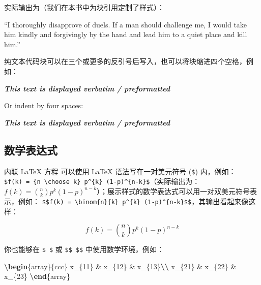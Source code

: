 \documentclass[
  12pt,
]{krantz}
\newenvironment{Shaded}{\begin{snugshade}}{\end{snugshade}}
\newcommand{\ExtensionTok}[1]{#1}
\newcommand{\InformationTok}[1]{\textcolor[rgb]{0.56,0.35,0.01}{\textbf{\textit{#1}}}}
\newcommand{\KeywordTok}[1]{\textcolor[rgb]{0.13,0.29,0.53}{\textbf{#1}}}
\newcommand{\NormalTok}[1]{#1}
\newcommand{\SpecialCharTok}[1]{\textcolor[rgb]{0.81,0.36,0.00}{\textbf{#1}}}
\newcommand{\SpecialStringTok}[1]{\textcolor[rgb]{0.31,0.60,0.02}{#1}}
\renewenvironment{quote}{\begin{VF}}{\end{VF}}
\theoremstyle{definition}
\theoremstyle{definition}
\theoremstyle{definition}
\theoremstyle{definition}
\theoremstyle{remark}
\begin{document}
实际输出为（我们在本书中为块引用定制了样式）：

\begin{quote}
``I thoroughly disapprove of duels. If a man should challenge me,
I would take him kindly and forgivingly by the hand and lead him
to a quiet place and kill him.''

\end{quote}

纯文本代码块可以在三个或更多的反引号后写入，也可以将块缩进四个空格，例如：

\begin{Shaded}
\begin{Highlighting}[]
\InformationTok{\textasciigrave{}\textasciigrave{}\textasciigrave{}}
\InformationTok{This text is displayed verbatim / preformatted}
\InformationTok{\textasciigrave{}\textasciigrave{}\textasciigrave{}}

\NormalTok{Or indent by four spaces:}

\InformationTok{    This text is displayed verbatim / preformatted}
\end{Highlighting}
\end{Shaded}

\subsection{数学表达式}\label{ux6570ux5b66ux8868ux8fbeux5f0f}

内联 LaTeX 方程 可以使用 LaTeX 语法写在一对美元符号 (\texttt{\$}) 内，例如：\texttt{\$f(k)\ =\ \{n\ \textbackslash{}choose\ k\}\ p\^{}\{k\}\ (1-p)\^{}\{n-k\}\$}（实际输出为：\(f(k)=\binom{n}{k}p^{k}(1-p)^{n-k}\)）；展示样式的数学表达式可以用一对双美元符号表示，例如： \texttt{\$\$f(k)\ =\ \textbackslash{}binom\{n\}\{k\}\ p\^{}\{k\}\ (1-p)\^{}\{n-k\}\$\$}，其输出看起来像这样：

\[f\left(k\right)=\binom{n}{k}p^k\left(1-p\right)^{n-k}\]

你也能够在 \texttt{\$\ \$} 或 \texttt{\$\$\ \$\$} 中使用数学环境，例如：

\begin{Shaded}
\begin{Highlighting}[]
\SpecialStringTok{$$}\KeywordTok{\textbackslash{}begin}\NormalTok{\{}\ExtensionTok{array}\NormalTok{\}}\SpecialStringTok{\{ccc\}}
\SpecialStringTok{x\_\{11\} \& x\_\{12\} \& x\_\{13\}}\SpecialCharTok{\textbackslash{}\textbackslash{}}
\SpecialStringTok{x\_\{21\} \& x\_\{22\} \& x\_\{23\}}
\KeywordTok{\textbackslash{}end}\NormalTok{\{}\ExtensionTok{array}\NormalTok{\}}\SpecialStringTok{$$}
\end{Highlighting}
\end{Shaded}
\end{document}
